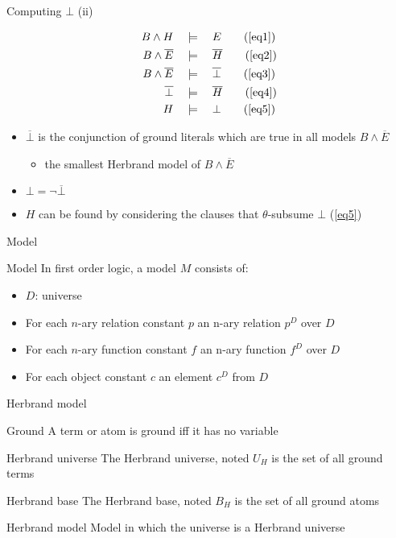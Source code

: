\begin{frame}{Computing $\bot$ (ii)}

\begin{align}
B \land H \quad &\models \quad E \tag{\ref{eq1}} \\
B \land \overline{E} \quad &\models \quad \overline{H} \tag{\ref{eq2}} \\
B \land \overline{E} \quad &\models \quad \overline{\bot} \tag{\ref{eq3}} \\
\overline{\bot} \quad &\models \quad \overline{H} \tag{\ref{eq4}} \\
H \quad &\models \quad \bot \tag{\ref{eq5}}
\end{align}

\begin{itemize}
    \item $\overline{\bot}$ is the conjunction of ground literals which are true in all models $B \land \overline{E}$
    \begin{itemize}
        \item[\ding{43}] the smallest Herbrand model of $B \land \overline{E}$ 
    \end{itemize}
    \item $\bot = \neg \overline{\bot}$
    \item $H$ can be found by considering the clauses that $\theta$-subsume $\bot$ (\ref{eq5})
\end{itemize}
    
\end{frame}

\begin{frame}{Model}
\begin{block}{Model}
In first order logic, a model $M$ consists of:
\begin{itemize}
    \item $D$: universe
    \item For each $n$-ary relation constant $p$ an n-ary relation $p^D$ over $D$
    \item For each $n$-ary function constant $f$ an n-ary function $f^D$ over $D$
    \item For each object constant $c$ an element $c^D$ from $D$
\end{itemize}
\end{block}    
\end{frame}

\begin{frame}{Herbrand model}
\begin{block}{Ground}
A term or atom is ground iff it has no variable
\end{block}    
\begin{block}{Herbrand universe}
The Herbrand universe, noted $U_H$ is the set of all ground terms
\end{block}
\begin{block}{Herbrand base}
The Herbrand base, noted $B_H$ is the set of all ground atoms
\end{block}
\begin{block}{Herbrand model}
Model in which the universe is a Herbrand universe
\end{block}
\end{frame}

